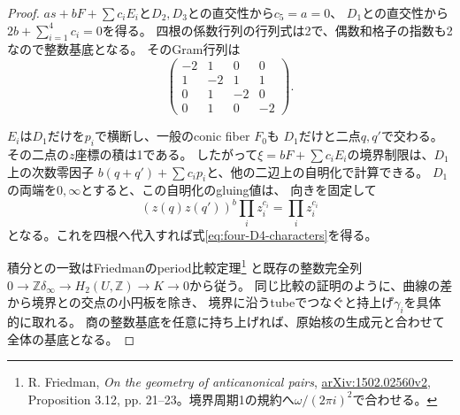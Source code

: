 \begin{proof}
$as+bF+\sum c_iE_i$と$D_2,D_3$との直交性から$c_5=a=0$、
$D_1$との直交性から$2b+\sum_{i=1}^4c_i=0$を得る。
四根の係数行列の行列式は2で、偶数和格子の指数も2なので整数基底となる。
そのGram行列は
\[
 \begin{pmatrix}-2&1&0&0\\1&-2&1&1\\0&1&-2&0\\0&1&0&-2\end{pmatrix}.
\]

$E_i$は$D_1$だけを$p_i$で横断し、一般のconic fiber $F_0$も
$D_1$だけと二点$q,q'$で交わる。その二点の$z$座標の積は1である。
したがって$\xi=bF+\sum c_iE_i$の境界制限は、$D_1$上の次数零因子
$b(q+q')+\sum c_ip_i$と、他の二辺上の自明化で計算できる。
$D_1$の両端を$0,\infty$とすると、この自明化のgluing値は、
向きを固定して
\[
 (z(q)z(q'))^b\prod_i z_i^{c_i}=\prod_i z_i^{c_i}
\]
となる。これを四根へ代入すれば式\eqref{eq:four-D4-characters}を得る。

積分との一致はFriedmanのperiod比較定理\footnote{
R. Friedman, \emph{On the geometry of anticanonical pairs},
\href{https://arxiv.org/abs/1502.02560}{arXiv:1502.02560v2},
Proposition 3.12, pp. 21--23。境界周期1の規約へ$\omega/(2\pi i)^2$で合わせる。}
と既存の整数完全列
$0\to\mathbb Z\delta_\infty\to H_2(U,\mathbb Z)\to K\to0$から従う。
同じ比較の証明のように、曲線の差から境界との交点の小円板を除き、
境界に沿うtubeでつなぐと持上げ$\gamma_i$を具体的に取れる。
商の整数基底を任意に持ち上げれば、原始核の生成元と合わせて全体の基底となる。
\end{proof}

